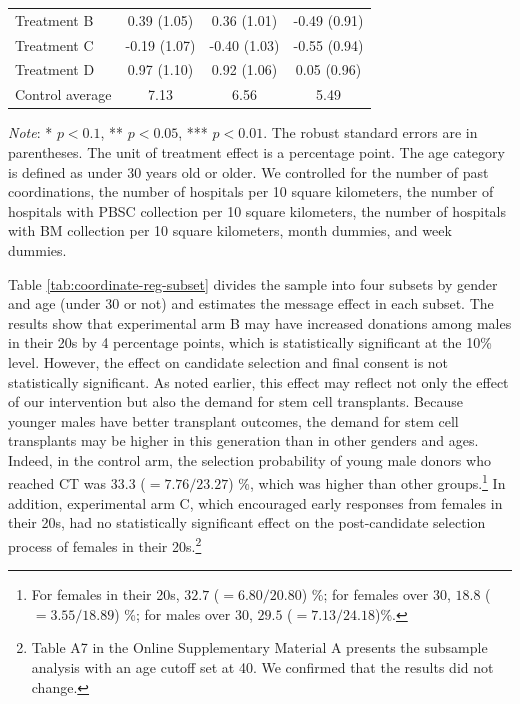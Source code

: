 \documentclass[12pt, a4paper]{article}
\begin{document}
\begin{table}
\begin{threeparttable}
\begin{tabular}[t]{lccc}
\hspace{1em}Treatment B & 0.39 (1.05) & 0.36 (1.01) & -0.49 (0.91)\\
\hspace{1em}Treatment C & -0.19 (1.07) & -0.40 (1.03) & -0.55 (0.94)\\
\hspace{1em}Treatment D & 0.97 (1.10) & 0.92 (1.06) & 0.05 (0.96)\\
\hspace{1em}Control average & 7.13 & 6.56 & 5.49\\
\bottomrule
\end{tabular}
\begin{tablenotes}
\item \emph{Note}: * $p < 0.1$, ** $p < 0.05$, *** $p < 0.01$. The robust standard errors are in parentheses. The unit of treatment effect is a percentage point. The age category is defined as under 30 years old or older. We controlled for the number of past coordinations, the number of hospitals per 10 square kilometers, the number of hospitals with PBSC collection per 10 square kilometers, the number of hospitals with BM collection per 10 square kilometers, month dummies, and week dummies.
\end{tablenotes}
\end{threeparttable}
\end{table}

Table \ref{tab:coordinate-reg-subset} divides the sample into four subsets by gender and age (under 30 or not) and estimates the message effect in each subset. The results show that experimental arm B may have increased donations among males in their 20s by 4 percentage points, which is statistically significant at the 10\% level. However, the effect on candidate selection and final consent is not statistically significant. As noted earlier, this effect may reflect not only the effect of our intervention but also the demand for stem cell transplants. Because younger males have better transplant outcomes, the demand for stem cell transplants may be higher in this generation than in other genders and ages. Indeed, in the control arm, the selection probability of young male donors who reached CT was \(33.3\) (\(=7.76/23.27\)) \%, which was higher than other groups.\footnote{For females in their 20s, \(32.7\) (\(=6.80 / 20.80\)) \%; for females over 30, \(18.8\) (\(=3.55 / 18.89\)) \%; for males over 30, \(29.5\) (\(=7.13/24.18\))\%.} In addition, experimental arm C, which encouraged early responses from females in their 20s, had no statistically significant effect on the post-candidate selection process of females in their 20s.\footnote{Table A7 in the Online Supplementary Material A presents the subsample analysis with an age cutoff set at 40. We confirmed that the results did not change.}
\end{document}
